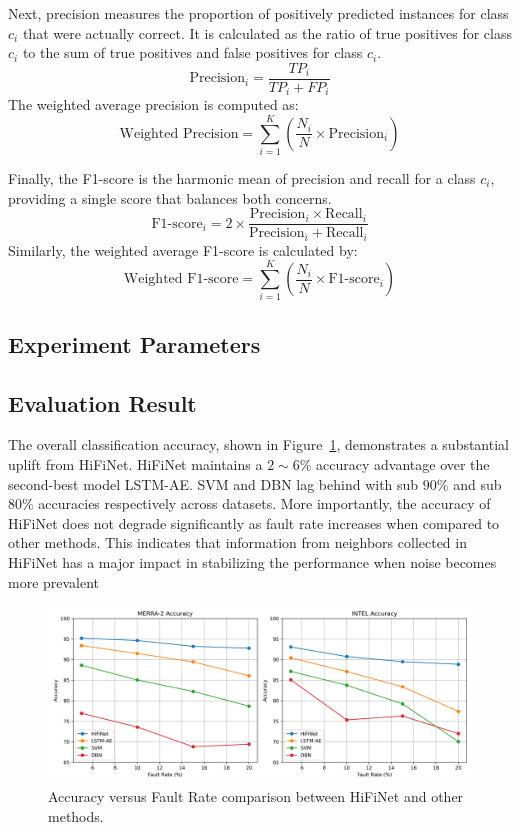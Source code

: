 Next, precision measures the proportion of positively predicted instances for class \(c_i\) that were actually correct. It is calculated as the ratio of true positives for class \(c_i\) to the sum of true positives and false positives for class \(c_i\).
\begin{equation}
  \text{Precision}_i = \frac{TP_i}{TP_i + FP_i}
\end{equation}
The weighted average precision is computed as:
\begin{equation}
  \text{Weighted Precision} = \sum_{i=1}^{K} \left( \frac{N_i}{N} \times \text{Precision}_i \right)
\end{equation}

Finally, the F1-score is the harmonic mean of precision and recall for a class \(c_i\), providing a single score that balances both concerns.
\begin{equation}
  \text{F1-score}_i = 2 \times \frac{\text{Precision}_i \times \text{Recall}_i}{\text{Precision}_i + \text{Recall}_i}
\end{equation}
Similarly, the weighted average F1-score is calculated by:
\begin{equation}
  \text{Weighted F1-score} = \sum_{i=1}^{K} \left( \frac{N_i}{N} \times \text{F1-score}_i \right)
\end{equation}

\subsection{Experiment Parameters}

\subsection{Evaluation Result}
The overall classification accuracy, shown in Figure~\ref{fig:accuracy}, demonstrates a substantial uplift from HiFiNet. HiFiNet maintains a \(2\sim6\%\) accuracy advantage over the second-best model LSTM-AE. SVM and DBN lag behind with sub \(90\%\) and sub \(80\%\) accuracies respectively across datasets. More importantly, the accuracy of HiFiNet does not degrade significantly as fault rate increases when compared to other methods. This indicates that information from neighbors collected in HiFiNet has a major impact in stabilizing the performance when noise becomes more prevalent

\begin{figure}
  \centering
  \includegraphics[width=\linewidth]{images/accuracy.png}
  \caption{Accuracy versus Fault Rate comparison between HiFiNet and other methods.}
  \label{fig:accuracy}
\end{figure}

